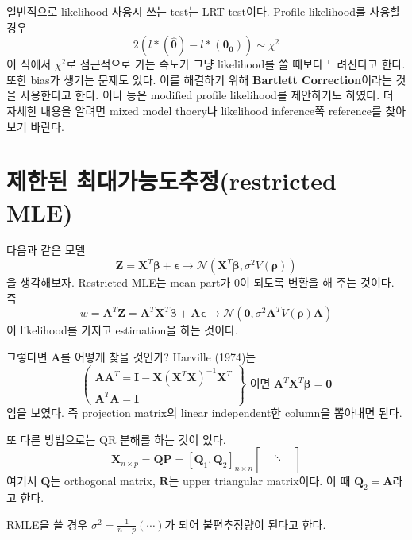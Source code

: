 \documentclass[b5paper,]{scrbook}
\theoremstyle{plain}
\theoremstyle{definition}
\numberwithin{equation}{section}
\begin{document}
일반적으로 likelihood 사용시 쓰는 test는 LRT test이다. Profile
likelihood를 사용할 경우
\[2(l*(\hat{\boldsymbol{\theta}})-l*(\boldsymbol{\theta_{0}})) \sim \chi^{2}\]
이 식에서 \(\chi^{2}\)로 점근적으로 가는 속도가 그냥 likelihood를 쓸
때보다 느려진다고 한다. 또한 bias가 생기는 문제도 있다. 이를 해결하기
위해 \textbf{Bartlett Correction}이라는 것을 사용한다고 한다.
\citep{BarndorfF-Nielsen1983}이나 \citep{Cox1987} 등은 modified profile
likelihood를 제안하기도 하였다. 더 자세한 내용을 알려면 mixed model
thoery나 likelihood inference쪽 reference를 찾아보기 바란다.

\section{제한된 최대가능도추정(restricted MLE)}\label{-restricted-mle}

다음과 같은 모델
\[\mathbf{Z}=\mathbf{X}^{T}\boldsymbol{\beta}+\boldsymbol{\epsilon} \rightarrow \mathcal{N}(\mathbf{X}^{T}\boldsymbol{\beta}, \sigma^{2}V(\boldsymbol{\rho}))\]
을 생각해보자. Restricted MLE는 mean part가 0이 되도록 변환을 해 주는
것이다. 즉
\[w=\mathbf{A}^{T}\mathbf{Z}=\mathbf{A}^{T}\mathbf{X}^{T}\boldsymbol{\beta}+\mathbf{A}\boldsymbol{\epsilon} \rightarrow \mathcal{N}(\mathbf{0},\sigma^{2}\mathbf{A}^{T}V(\boldsymbol{\rho})\mathbf{A})\]
이 likelihood를 가지고 estimation을 하는 것이다.

그렇다면 \(\mathbf{A}\)를 어떻게 찾을 것인가? Harville (1974)는 \[
\left(\begin{array}{l}
\mathbf{A}\mathbf{A}^{T}=\mathbf{I}-\mathbf{X}(\mathbf{X}^{T}\mathbf{X})^{-1}\mathbf{X}^{T}\\
\mathbf{A}^{T}\mathbf{A}=\mathbf{I}
\end{array}
\right\} \text{ 이면 } \mathbf{A}^{T}\mathbf{X}^{T}\boldsymbol{\beta}=\mathbf{0}
\] 임을 보였다. 즉 projection matrix의 linear independent한 column을
뽑아내면 된다.

또 다른 방법으로는 QR 분해를 하는 것이 있다. \[
\mathbf{X}_{n\times p}=\mathbf{Q}\mathbf{P}=[\mathbf{Q}_{1}, \mathbf{Q}_{2}]_{n\times n}
\begin{bmatrix}
 &  &  \\
 & \ddots &  \\
 &  & \\
\end{bmatrix}
\] 여기서 \(\mathbf{Q}\)는 orthogonal matrix, \(\mathbf{R}\)는 upper
triangular matrix이다. 이 때 \(\mathbf{Q}_{2}=\mathbf{A}\)라고 한다.

RMLE을 쓸 경우 \(\sigma^{2}=\frac{1}{n-p}( \cdots )\)가 되어
불편추정량이 된다고 한다.
\end{document}
